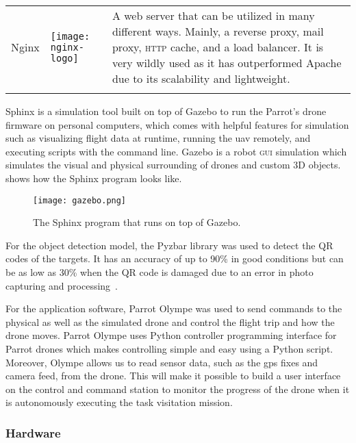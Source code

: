 \documentclass[../main.tex]{subfiles}
\begin{document}
\begin{table}[p]
\begin{tabular}{ p{3cm} p{3cm} p{6cm} }
				\\ 
				\addlinespace				
		Nginx
		& 
		\raisebox{-0.9\height}
		{\texttt{[image: nginx-logo]}}
		& A web server that can be utilized in many different ways. Mainly, a 
		reverse proxy, mail proxy, \textsc{http} cache, and a load balancer. 
		It is very wildly used as it has outperformed Apache due to its 
		scalability and lightweight.
		\\ 
		\addlinespace
		
        \bottomrule
    \end{tabular}
\end{table}

Sphinx is a simulation 
tool built on top of Gazebo 
to run the Parrot's drone firmware on 
personal computers, which comes with helpful 
features for simulation such as visualizing flight 
data at runtime, running the \gls{uav} remotely, 
and executing scripts with the command line. 
Gazebo is a robot \textsc{gui} simulation 
which simulates the visual and physical surrounding 
of drones and custom 3D objects. 
 shows how the Sphinx 
program looks like. 

\begin{figure}[tbp]
    \centering
    \texttt{[image: gazebo.png]}
    \caption{The Sphinx program that runs on top of Gazebo.}
    \label{fig:gazebo}
\end{figure}

For the object detection model, the Pyzbar library was used to detect
the QR codes of the targets.
It has an accuracy of up to 90\% in good conditions but can be as
low as 30\% when the QR code is damaged due to an error in photo
capturing and processing~\cite{dynamsoft}.

For the application software, Parrot Olympe 
was used to send commands to the physical as well as 
the simulated drone and control the flight trip and 
how the drone moves. Parrot Olympe uses Python 
controller programming interface for Parrot drones 
which makes controlling simple and easy using a 
Python script. Moreover, Olympe allows us to read
sensor data, such as the \gls{gps} fixes and camera feed, 
from the \anafi
drone. This will make it possible to build a user interface
on the control and command station to monitor 
the progress of the drone
when it is autonomously executing the task visitation
mission.



\subsubsection{Hardware}
\end{document}
